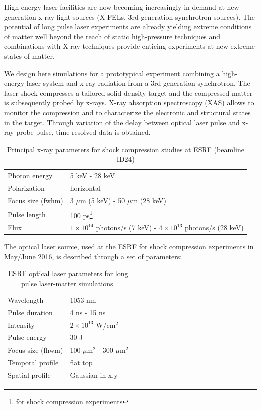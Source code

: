\documentclass[12pt]{scrartcl}
\begin{document}
High-energy laser facilities are now becoming increasingly in demand at new
generation x-ray light sources (X-FELs, 3rd generation synchrotron sources). The potential of long pulse laser experiments are already yielding extreme conditions of matter well beyond the reach of static high-pressure techniques and combinations with X-ray techniques provide enticing experiments at new extreme states of matter.

We design here simulations for a prototypical experiment combining a high-energy laser system and x-ray radiation
from a 3rd generation synchrotron. The laser shock-compresses a tailored solid density target and the compressed
matter is subsequently probed by x-rays. X-ray absorption spectroscopy (XAS) allows to monitor the compression and
to characterize the electronic and structural states in the target. Through variation of the delay between optical
laser pulse and x-ray probe pulse, time resolved data is obtained.

\begin{table}
  \centering
  \begin{tabular}{ll}
    \hline
    Photon energy & 5 keV - 28 keV \\
    Polarization & horizontal \\
    Focus size (fwhm) & 3 $\mu$m (5 keV) - 50 $\mu$m (28 keV)\\
    Pulse length & 100 ps\footnote{for shock compression experiments}\\
    Flux  & $1\times 10^{14}$ photons/s (7 keV) - $4\times 10^{13}$ photons/s (28 keV) \\
    \hline
  \end{tabular}
  \caption{Principal x-ray parameters for shock compression studies at ESRF
  (beamline ID24)}
  \label{tab:esrf_parameters}
\end{table}

The optical laser source, used at the ESRF for shock compression experiments in May/June 2016,  is described through a set of parameters:
\begin{table}
  \centering
  \begin{tabular}{ll}
    \hline
Wavelength & 1053 nm \\
Pulse duration & 4 ns - 15 ns \\
Intensity & $2\times 10^{13}$ W/cm$^2$ \\
Pulse energy & 30 J \\
Focus size (fhwm) & 100 $\mu\text{m}^{2}$ - 300 $\mu\text{m}^{2}$  \\
Temporal profile  & flat top \\
Spatial profile & Gaussian in x,y \\
    \hline
  \end{tabular}
  \caption{ESRF optical laser parameters for long pulse laser-matter
  simulations.}
  \label{tab:esrf_long_pulse}
\end{table}
\end{document}
